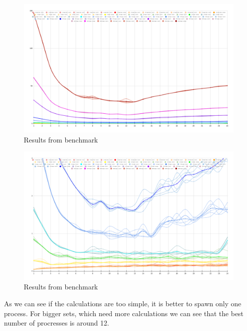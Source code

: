 \begin{figure}[H]
    \centering
    \includegraphics[width=18cm]{images/perfsAll.png}
    \caption{Results from benchmark}
    \label{fig:benchmarkRes}
\end{figure}
\begin{figure}[H]
    \centering
    \includegraphics[width=18cm]{images/perfsAllZoomed.png}
    \caption{Results from benchmark}
    \label{fig:benchmarkResZoomed}
\end{figure}
As we can see if the calculations are too simple, it is better to spawn only one process.
For bigger sets, which need more calculations we can see that the best number of procresses is around 12.

